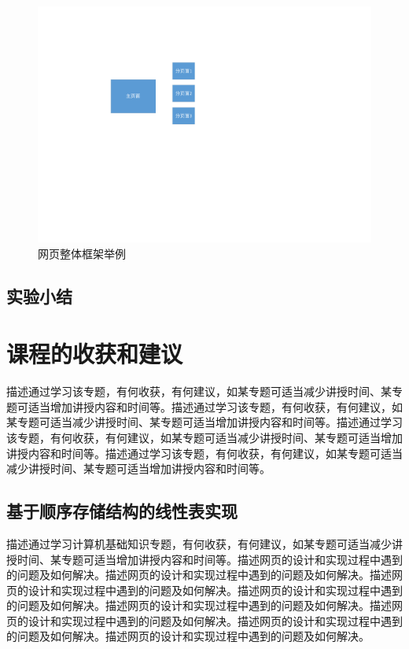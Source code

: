 \documentclass[supercite]{HustGraduPaper}
\theoremstyle{definition}
\begin{document}
    \begin{figure}[htb] %
        \begin{center}
            \includegraphics[scale=0.80]{images/1-1.pdf}
            \caption{网页整体框架举例}
            \label{fig5-1}
        \end{center}
    \end{figure}

    \subsection{实验小结}

    \newpage


    \section{课程的收获和建议}

    描述通过学习该专题，有何收获，有何建议，如某专题可适当减少讲授时间、某专题可适当增加讲授内容和时间等。描述通过学习该专题，有何收获，有何建议，如某专题可适当减少讲授时间、某专题可适当增加讲授内容和时间等。描述通过学习该专题，有何收获，有何建议，如某专题可适当减少讲授时间、某专题可适当增加讲授内容和时间等。描述通过学习该专题，有何收获，有何建议，如某专题可适当减少讲授时间、某专题可适当增加讲授内容和时间等。

    \subsection{基于顺序存储结构的线性表实现}

    描述通过学习计算机基础知识专题，有何收获，有何建议，如某专题可适当减少讲授时间、某专题可适当增加讲授内容和时间等。描述网页的设计和实现过程中遇到的问题及如何解决。描述网页的设计和实现过程中遇到的问题及如何解决。描述网页的设计和实现过程中遇到的问题及如何解决。描述网页的设计和实现过程中遇到的问题及如何解决。描述网页的设计和实现过程中遇到的问题及如何解决。描述网页的设计和实现过程中遇到的问题及如何解决。描述网页的设计和实现过程中遇到的问题及如何解决。描述网页的设计和实现过程中遇到的问题及如何解决。
\end{document}
